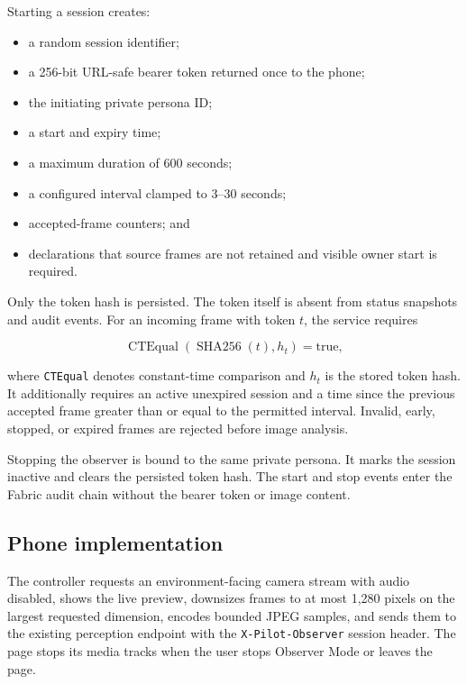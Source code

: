 \documentclass[11pt,a4paper]{article}
\begin{document}
Starting a session creates:

\begin{itemize}[leftmargin=*]
  \item a random session identifier;
  \item a 256-bit URL-safe bearer token returned once to the phone;
  \item the initiating private persona ID;
  \item a start and expiry time;
  \item a maximum duration of 600 seconds;
  \item a configured interval clamped to 3--30 seconds;
  \item accepted-frame counters; and
  \item declarations that source frames are not retained and visible owner
        start is required.
\end{itemize}

Only the token hash is persisted.  The token itself is absent from status
snapshots and audit events.  For an incoming frame with token $t$, the service
requires

\begin{equation}
 \operatorname{CTEqual}(\operatorname{SHA256}(t),h_t)=\mathrm{true},
\end{equation}

where \texttt{CTEqual} denotes constant-time comparison and $h_t$ is the
stored token hash.  It additionally requires an active unexpired session and a
time since the previous accepted frame greater than or equal to the permitted
interval.  Invalid, early, stopped, or expired frames are rejected before image
analysis.

Stopping the observer is bound to the same private persona.  It marks the
session inactive and clears the persisted token hash.  The start and stop
events enter the Fabric audit chain without the bearer token or image content.

\subsection{Phone implementation}

The controller requests an environment-facing camera stream with audio
disabled, shows the live preview, downsizes frames to at most 1,280 pixels on
the largest requested dimension, encodes bounded JPEG samples, and sends them
to the existing perception endpoint with the
\texttt{X-Pilot-Observer} session header.  The page stops its media tracks when
the user stops Observer Mode or leaves the page.
\end{document}
